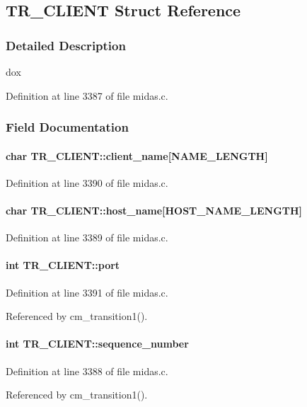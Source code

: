 \subsection{TR\_\-CLIENT Struct Reference}
\label{structTR__CLIENT}


\subsubsection{Detailed Description}
dox 

Definition at line 3387 of file midas.c.

\subsubsection{Field Documentation}
\paragraph[{client\_\-name}]{\setlength{\rightskip}{0pt plus 5cm}char {\bf TR\_\-CLIENT::client\_\-name}\mbox{[}NAME\_\-LENGTH\mbox{]}}\hfill\label{structTR__CLIENT_a81c9b3699ef11234ab2bb0f45ef0d84a}


Definition at line 3390 of file midas.c.
\paragraph[{host\_\-name}]{\setlength{\rightskip}{0pt plus 5cm}char {\bf TR\_\-CLIENT::host\_\-name}\mbox{[}HOST\_\-NAME\_\-LENGTH\mbox{]}}\hfill\label{structTR__CLIENT_add21aab4f69f309f4ffa530e2ed0efe5}


Definition at line 3389 of file midas.c.
\paragraph[{port}]{\setlength{\rightskip}{0pt plus 5cm}int {\bf TR\_\-CLIENT::port}}\hfill\label{structTR__CLIENT_afe2146a4f281df6204405b0236b0e7b3}


Definition at line 3391 of file midas.c.

Referenced by cm\_\-transition1().
\paragraph[{sequence\_\-number}]{\setlength{\rightskip}{0pt plus 5cm}int {\bf TR\_\-CLIENT::sequence\_\-number}}\hfill\label{structTR__CLIENT_aed66eb88c8f034eb3d9a62b83a93cf77}


Definition at line 3388 of file midas.c.

Referenced by cm\_\-transition1().
